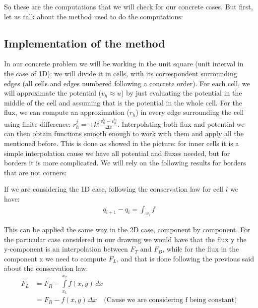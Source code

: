 \documentclass{article}
\begin{document}
    So these are the computations that we will check for our concrete cases. But first, let us talk about the method used to do the computations:
    \subsection*{Implementation of the method}
    In our concrete problem we will be working in the unit square (unit interval in the case of 1D): we will divide it in cells, with its correspondent surrounding edges (all cells and edges numbered following a concrete order). For each cell, we will approximate the potential ($v_h \approx u$) by just evaluating the potential in the middle of the cell and assuming that is the potential in the whole cell. For the flux, we can compute an approximation ($r_h$) in every edge surrounding the cell using finite difference: $r_h^j = \pm k^j \frac{v_h^{i_1}- v_h^{i_2}}{\Delta x}$. Interpolating both flux and potential we can then obtain functions smooth enough to work with them and apply all the mentioned before.
    This is done as showed in the picture: for inner cells it is a simple interpolation cause we have all potential and fluxes needed, but for borders it is more complicated. We will rely on the following results for borders that are not corners:

    If we are considering the 1D case, following the conservation law for cell $i$ we have:
    \begin{align*}
        q_{i+1} - q_i =  \int_{w_i} f
    \end{align*}

    This can be applied the same way in the 2D case, component by component. For the particular case considered in our drawing we would have that the flux y the y-component is an interpolation between $F_T$ and $F_B$, while for the flux in the component x we need to compute $F_L$, and that is done following the previous said about the conservation law:
    \begin{align*}
        F_L &= F_R - \int\limits_{x_1}^{x_2} f(x,y) \,dx\ \\
        &=  F_R - f(x,y)\Delta x \quad \text{(Cause we are considering f being constant)}
    \end{align*}
\end{document}
